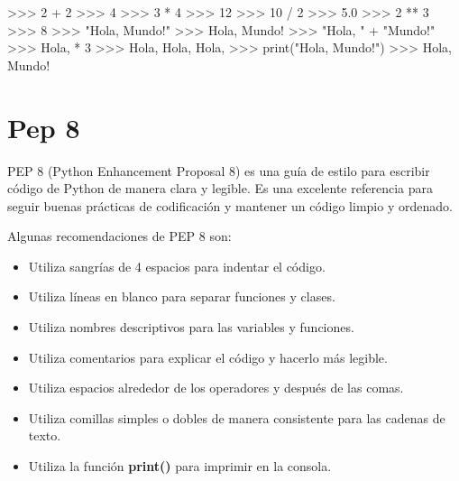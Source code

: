 \documentclass[
  a4paper,
  DIV=11,
  numbers=noendperiod,
  onepage,
  openany]{scrreprt}
\newenvironment{Shaded}{\begin{snugshade}}{\end{snugshade}}
\newcommand{\BuiltInTok}[1]{\textcolor[rgb]{0.00,0.23,0.31}{#1}}
\newcommand{\DecValTok}[1]{\textcolor[rgb]{0.68,0.00,0.00}{#1}}
\newcommand{\FloatTok}[1]{\textcolor[rgb]{0.68,0.00,0.00}{#1}}
\newcommand{\NormalTok}[1]{\textcolor[rgb]{0.00,0.23,0.31}{#1}}
\newcommand{\OperatorTok}[1]{\textcolor[rgb]{0.37,0.37,0.37}{#1}}
\newcommand{\StringTok}[1]{\textcolor[rgb]{0.13,0.47,0.30}{#1}}
\begin{document}
\begin{Shaded}
\begin{Highlighting}[]
\OperatorTok{\textgreater{}\textgreater{}\textgreater{}} \DecValTok{2} \OperatorTok{+} \DecValTok{2}
\OperatorTok{\textgreater{}\textgreater{}\textgreater{}} \DecValTok{4}
\OperatorTok{\textgreater{}\textgreater{}\textgreater{}} \DecValTok{3} \OperatorTok{*} \DecValTok{4}
\OperatorTok{\textgreater{}\textgreater{}\textgreater{}} \DecValTok{12}
\OperatorTok{\textgreater{}\textgreater{}\textgreater{}} \DecValTok{10} \OperatorTok{/} \DecValTok{2}
\OperatorTok{\textgreater{}\textgreater{}\textgreater{}} \FloatTok{5.0}
\OperatorTok{\textgreater{}\textgreater{}\textgreater{}} \DecValTok{2} \OperatorTok{**} \DecValTok{3}
\OperatorTok{\textgreater{}\textgreater{}\textgreater{}} \DecValTok{8}
\OperatorTok{\textgreater{}\textgreater{}\textgreater{}} \StringTok{"Hola, Mundo!"}
\OperatorTok{\textgreater{}\textgreater{}\textgreater{}} \StringTok{\textquotesingle{}Hola, Mundo!\textquotesingle{}}
\OperatorTok{\textgreater{}\textgreater{}\textgreater{}} \StringTok{"Hola, "} \OperatorTok{+} \StringTok{"Mundo!"}
\OperatorTok{\textgreater{}\textgreater{}\textgreater{}} \StringTok{\textquotesingle{}Hola, \textquotesingle{}} \OperatorTok{*} \DecValTok{3}
\OperatorTok{\textgreater{}\textgreater{}\textgreater{}} \StringTok{\textquotesingle{}Hola, Hola, Hola, \textquotesingle{}}
\OperatorTok{\textgreater{}\textgreater{}\textgreater{}} \BuiltInTok{print}\NormalTok{(}\StringTok{"Hola, Mundo!"}\NormalTok{)}
\OperatorTok{\textgreater{}\textgreater{}\textgreater{}}\NormalTok{ Hola, Mundo}\OperatorTok{!}
\end{Highlighting}
\end{Shaded}

\chapter{Pep 8}\label{pep-8}

PEP 8 (Python Enhancement Proposal 8) es una guía de estilo para
escribir código de Python de manera clara y legible. Es una excelente
referencia para seguir buenas prácticas de codificación y mantener un
código limpio y ordenado.

Algunas recomendaciones de PEP 8 son:

\begin{itemize}
\item
  Utiliza sangrías de 4 espacios para indentar el código.
\item
  Utiliza líneas en blanco para separar funciones y clases.
\item
  Utiliza nombres descriptivos para las variables y funciones.
\item
  Utiliza comentarios para explicar el código y hacerlo más legible.
\item
  Utiliza espacios alrededor de los operadores y después de las comas.
\item
  Utiliza comillas simples o dobles de manera consistente para las
  cadenas de texto.
\item
  Utiliza la función \textbf{print()} para imprimir en la consola.
\end{itemize}
\end{document}
